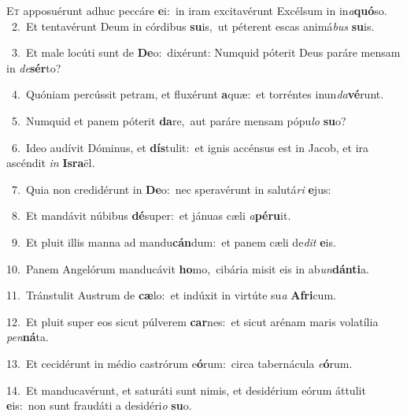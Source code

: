 \lettrine{\initial\textcolor{\initialcolor}{E}}{t} apposuérunt adhuc peccáre \textbf{e}\-i:~\star in iram excitavérunt Excélsum in in\-\textit{a}\-\textbf{quó}so.\\
{\numbfont\textcolor{\numbcolor}{~2.}}~Et tentavérunt Deum in córdibus \textbf{su}\-is,~\star ut péterent escas animá\textit{bus} \textbf{su}\-is.\par
{\numbfont\textcolor{\numbcolor}{~3.}}~Et male locúti sunt de \textbf{De}\-o:~\star dixérunt: Numquid póterit Deus paráre mensam in \textit{de}\-\textbf{sér}to?\par
{\numbfont\textcolor{\numbcolor}{~4.}}~Quóniam percússit petram, et fluxérunt \textbf{a}\-quæ:~\star et torréntes inun\-\textit{da}\-\textbf{vé}runt.\par
{\numbfont\textcolor{\numbcolor}{~5.}}~Numquid et panem póterit \textbf{da}\-re,~\star aut paráre mensam pópu\textit{lo} \textbf{su}\-o?\par
{\numbfont\textcolor{\numbcolor}{~6.}}~Ideo audívit Dóminus, et \textbf{dís}\-tulit:~\star et ignis accénsus est in Jacob, et ira ascéndit \textit{in} \textbf{Is}\-\textbf{ra}ël.\par
{\numbfont\textcolor{\numbcolor}{~7.}}~Quia non credidérunt in \textbf{De}\-o:~\star nec speravérunt in salutá\textit{ri} \textbf{e}\-jus:\par
{\numbfont\textcolor{\numbcolor}{~8.}}~Et mandávit núbibus \textbf{dé}\-super:~\star et jánuas cæli \textit{a}\-\textbf{pé}\textbf{ru}it.\par
{\numbfont\textcolor{\numbcolor}{~9.}}~Et pluit illis manna ad mandu\-\textbf{cán}\-dum:~\star et panem cæli de\textit{dit} \textbf{e}\-is.\par
{\numbfont\textcolor{\numbcolor}{10.}}~Panem Angelórum manducávit \textbf{ho}\-mo,~\star cibária misit eis in ab\-\textit{un}\-\textbf{dán}\textbf{ti}a.\par
{\numbfont\textcolor{\numbcolor}{11.}}~Tránstulit Austrum de \textbf{cæ}\-lo:~\star et indúxit in virtúte su\textit{a} \textbf{A}\-\textbf{fri}cum.\par
{\numbfont\textcolor{\numbcolor}{12.}}~Et pluit super eos sicut púlverem \textbf{car}\-nes:~\star et sicut arénam maris volatília \textit{pen}\-\textbf{ná}ta.\par
{\numbfont\textcolor{\numbcolor}{13.}}~Et cecidérunt in médio castrórum e\-\textbf{ó}\-rum:~\star circa tabernácula \textit{e}\-\textbf{ó}rum.\par
{\numbfont\textcolor{\numbcolor}{14.}}~Et manducavérunt, et saturáti sunt nimis, et desidérium eórum áttulit \textbf{e}\-is:~\star non sunt fraudáti a desidéri\textit{o} \textbf{su}\-o.\par
